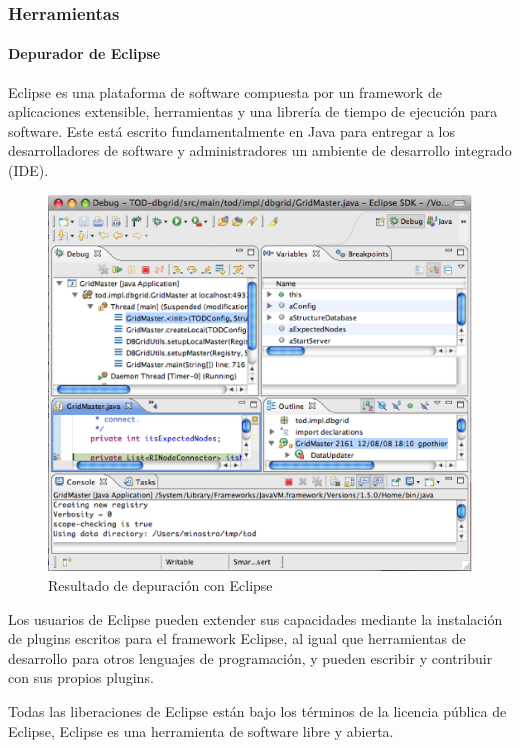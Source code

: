 \documentclass[12pt,legalpaper]{report}
\begin{document}
			\subsubsection{Herramientas}

				\paragraph{Depurador de Eclipse}
				
Eclipse es una plataforma de software compuesta por un framework de aplicaciones extensible, herramientas y una librería de tiempo de ejecución para software.  Este está escrito fundamentalmente en Java para entregar a los desarrolladores de software y administradores un ambiente de desarrollo integrado (IDE).

\begin{figure}[h]
	\centering
	\includegraphics[scale=0.35]{images/Eclipse.eps}
	\caption{Resultado de depuración con Eclipse}
\end{figure}

Los usuarios de Eclipse pueden extender sus capacidades mediante la instalación de plugins escritos para el framework Eclipse, al igual que herramientas de desarrollo para otros lenguajes de programación, y pueden escribir y contribuir con sus propios plugins.

Todas las liberaciones de Eclipse están bajo los términos de la licencia pública de Eclipse, Eclipse es una herramienta de software libre y abierta.
\end{document}
